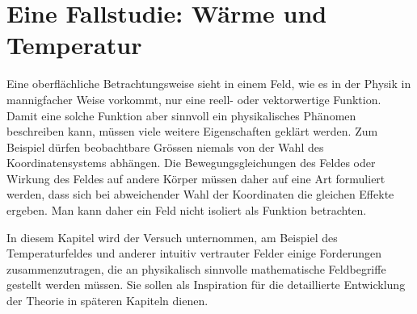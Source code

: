 %
%
%
\chapter{Eine Fallstudie: Wärme und Temperatur
\label{chapter:fallstudie}}
Eine oberflächliche Betrachtungsweise sieht in einem Feld, wie es in
der Physik in mannigfacher Weise vorkommt, nur eine reell- oder
vektorwertige Funktion.
Damit eine solche Funktion aber sinnvoll ein physikalisches Phänomen
beschreiben kann, müssen viele weitere Eigenschaften geklärt werden.
Zum Beispiel dürfen beobachtbare Grössen niemals von der Wahl des
Koordinatensystems abhängen.
Die Bewegungsgleichungen des Feldes oder Wirkung des Feldes auf
andere Körper müssen daher auf eine Art formuliert werden, dass sich
bei abweichender Wahl der Koordinaten die gleichen Effekte ergeben.
Man kann daher ein Feld nicht isoliert als Funktion betrachten.

In diesem Kapitel wird der Versuch unternommen, am Beispiel des
Temperaturfeldes und anderer intuitiv vertrauter Felder einige
Forderungen zusammenzutragen, die an physikalisch sinnvolle mathematische
Feldbegriffe gestellt werden müssen.
Sie sollen als Inspiration für die detaillierte Entwicklung der
Theorie in späteren Kapiteln dienen.







